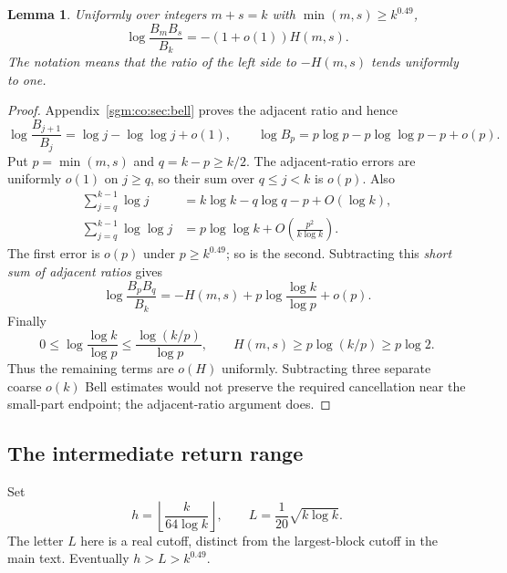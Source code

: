 \documentclass[11pt,letterpaper]{article}
\newtheorem{lemma}[theorem]{Lemma}\newtheorem{proposition}[theorem]{Proposition}\newtheorem{corollary}[theorem]{Corollary}
\theoremstyle{remark}\newtheorem{remark}[theorem]{Remark}
\theoremstyle{definition}\newtheorem{definition}[theorem]{Definition}
\begin{document}
\begin{lemma}\label{sgm:co:lem:entropy}
Uniformly over integers $m+s=k$ with $\min(m,s)\ge k^{0.49}$,
\begin{equation}\label{sgm:co:eq:entropy}
 \log\frac{B_mB_s}{B_k}=-(1+o(1))H(m,s).
\end{equation}
The notation means that the ratio of the left side to $-H(m,s)$ tends uniformly to one.
\end{lemma}
\begin{proof}
Appendix~\ref{sgm:co:sec:bell} proves the adjacent ratio and hence
\[
 \log\frac{B_{j+1}}{B_j}=\log j-\log\log j+o(1),\qquad
 \log B_p=p\log p-p\log\log p-p+o(p).
\]
Put $p=\min(m,s)$ and $q=k-p\ge k/2$. The adjacent-ratio errors are uniformly $o(1)$ on $j\ge q$, so their sum over $q\le j<k$ is $o(p)$. Also
\begin{align*}
 \sum_{j=q}^{k-1}\log j&=k\log k-q\log q-p+O(\log k),\\
 \sum_{j=q}^{k-1}\log\log j
 &=p\log\log k+O\left(\frac{p^2}{k\log k}\right).
\end{align*}
The first error is $o(p)$ under $p\ge k^{0.49}$; so is the second. Subtracting this \emph{short sum of adjacent ratios} gives
\[
 \log\frac{B_pB_q}{B_k}
 =-H(m,s)+p\log\frac{\log k}{\log p}+o(p).
\]
Finally
\[
 0\le\log\frac{\log k}{\log p}
 \le\frac{\log(k/p)}{\log p},\qquad H(m,s)\ge p\log(k/p)\ge p\log2.
\]
Thus the remaining terms are $o(H)$ uniformly. Subtracting three separate coarse $o(k)$ Bell estimates would not preserve the required cancellation near the small-part endpoint; the adjacent-ratio argument does.
\end{proof}

\subsection{The intermediate return range}\label{sgm:co:sec:intermediate}
Set
\begin{equation}\label{sgm:co:eq:cuts}
 h=\left\lfloor\frac{k}{64\log k}\right\rfloor,
 \qquad L=\frac1{20}\sqrt{k\log k}.
\end{equation}
The letter $L$ here is a real cutoff, distinct from the largest-block cutoff in the main text. Eventually $h>L>k^{0.49}$.
\end{document}
